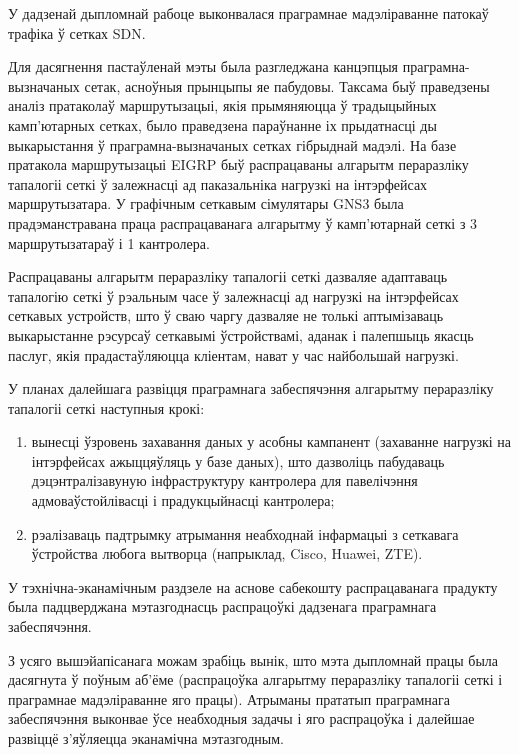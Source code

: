 
У дадзенай дыпломнай рабоце выконвалася праграмнае мадэліраванне
патокаў трафіка ў сетках SDN.

Для дасягнення пастаўленай мэты
была разгледжана канцэпцыя праграмна-вызначаных сетак, асноўныя прынцыпы
яе пабудовы. Таксама быў праведзены аналіз пратаколаў маршрутызацыі,
якія прымяняюцца ў традыцыйных камп'ютарных сетках, было праведзена
параўнанне іх прыдатнасці ды выкарыстання ў праграмна-вызначаных сетках
гібрыднай мадэлі. На базе пратакола маршрутызацыі EIGRP быў распрацаваны
алгарытм пераразліку тапалогіі сеткі ў залежнасці ад паказальніка нагрузкі
на інтэрфейсах маршрутызатара. У графічным сеткавым сімулятары GNS3 была
прадэманстравана праца распрацаванага алгарытму ў камп'ютарнай сеткі з
3 маршрутызатараў і 1 кантролера.

Распрацаваны алгарытм пераразліку тапалогіі сеткі дазваляе адаптаваць
тапалогію сеткі ў рэальным часе ў залежнасці ад нагрузкі на інтэрфейсах
сеткавых устройств, што ў сваю чаргу дазваляе не толькі аптымізаваць
выкарыстанне рэсурсаў сеткавымі ўстройствамі, аданак і палепшыць якасць паслуг,
якія прадастаўляюцца кліентам, нават у час найбольшай нагрузкі.

У планах далейшага развіцця праграмнага забеспячэння алгарытму
пераразліку тапалогіі сеткі наступныя крокі:
\begin{enumerate}
    \item вынесці ўзровень захавання даных у асобны кампанент (захаванне нагрузкі на інтэрфейсах ажыццяўляць у базе даных), што дазволіць
    пабудаваць дэцэнтралізавуную інфраструктуру кантролера для павелічэння
    адмоваўстойлівасці і прадукцыйнасці кантролера;
    \item рэалізаваць падтрымку атрымання неабходнай інфармацыі з
    сеткавага ўстройства любога вытворца (напрыклад, Cisco, Huawei, ZTE).
\end{enumerate}

У тэхнічна-эканамічным раздзеле на аснове сабекошту распрацаванага прадукту
была падцверджана мэтазгоднасць распрацоўкі дадзенага праграмнага забеспячэння.

З усяго вышэйапісанага можам зрабіць вынік, што мэта дыпломнай працы была
дасягнута ў поўным аб'ёме (распрацоўка алгарытму пераразліку тапалогіі
сеткі і праграмнае мадэліраванне яго працы). Атрыманы прататып
праграмнага забеспячэння выконвае ўсе неабходныя задачы і яго распрацоўка
і далейшае развіццё з'яўляецца эканамічна мэтазгодным.
